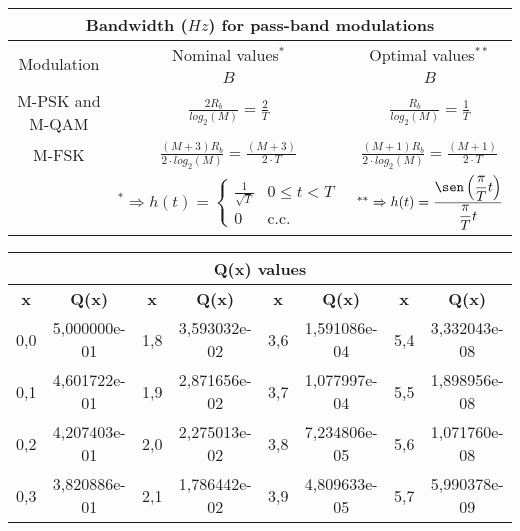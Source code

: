 \documentclass[12pt,es,blanco]{uah}
\begin{document}
\begin{center}
        \renewcommand{\arraystretch}{2}
        \begin{tabular}{|c|c|c|}
            \multicolumn{3}{c}{{\bf Bandwidth ($Hz$) for pass-band modulations}} \\
            \hline
            \multirow{2}{*}{Modulation} & Nominal values$^*$ & Optimal values$^{**}$ \\
            \cline{2-3}
            & $B$ & $B$ \\
            \hline
            M-PSK and M-QAM & $\displaystyle\frac{2 R_b}{log_2(M)} = \displaystyle\frac{2}{T}$ & $\displaystyle\frac{R_b}{log_2(M)} = \displaystyle\frac{1}{T}$ \\[1ex]
            \hline
            M-FSK & $\displaystyle\frac{(M+3) R_b}{2 \cdot log_2(M)} = \displaystyle\frac{(M+3)}{2\cdot T}$ & $\displaystyle\frac{(M+1) R_b}{2 \cdot log_2(M)} = \displaystyle\frac{(M+1)}{2\cdot T}$ \\[1ex]
            \hline
            & $^* \Rightarrow h(t) = \left \{ \begin{array}{lc} \displaystyle\frac{1}{\sqrt{T}} & 0\leq t < T \\ 0 & \text{c.c.} \end{array}\right. $ & $^{**} \Rightarrow h(t) = \displaystyle\frac{\sen\left ( \displaystyle\frac{\pi}{T} t \right ) }{\displaystyle\frac{\pi}{T}t}$ \\
            \hline
        \end{tabular}
        \renewcommand{\arraystretch}{1}
        \vspace{0.5cm}
    \begin{tabular}{cc|cc|cc|cc}
        \multicolumn{8}{c}{{\bf Q(x) values}} \\
        \hline
        {\bf x} & {\bf Q(x)} & {\bf x} & {\bf Q(x)} & {\bf x} & {\bf Q(x)} & {\bf x} & {\bf Q(x)} \\
        \hline
        0,0 & 5,000000e-01 & 1,8 & 3,593032e-02 & 3,6 & 1,591086e-04 & 5,4 & 3,332043e-08 \\
        0,1 & 4,601722e-01 & 1,9 & 2,871656e-02 & 3,7 & 1,077997e-04 & 5,5 & 1,898956e-08 \\
        0,2 & 4,207403e-01 & 2,0 & 2,275013e-02 & 3,8 & 7,234806e-05 & 5,6 & 1,071760e-08 \\
        0,3 & 3,820886e-01 & 2,1 & 1,786442e-02 & 3,9 & 4,809633e-05 & 5,7 & 5,990378e-09 \\

\end{tabular}
\end{center}
\end{document}
